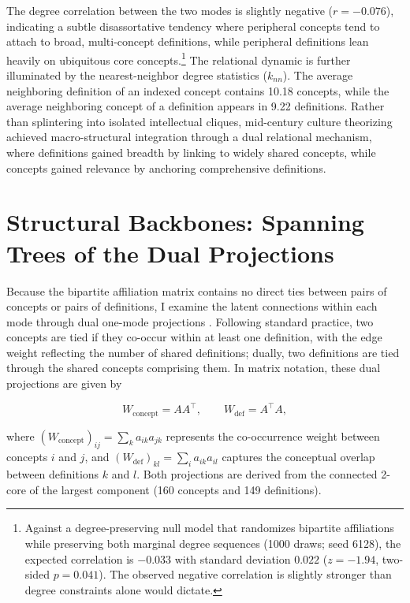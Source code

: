 \documentclass[11pt]{article}
\begin{document}
The degree correlation between the two modes is slightly negative ($r = -0.076$), indicating a subtle disassortative tendency where peripheral concepts tend to attach to broad, multi-concept definitions, while peripheral definitions lean heavily on ubiquitous core concepts.\footnote{Against a degree-preserving null model that randomizes bipartite affiliations while preserving both marginal degree sequences (1000 draws; seed 6128), the expected correlation is $-0.033$ with standard deviation $0.022$ ($z = -1.94$, two-sided $p = 0.041$). The observed negative correlation is slightly stronger than degree constraints alone would dictate.} The relational dynamic is further illuminated by the nearest-neighbor degree statistics ($k_{nn}$). The average neighboring definition of an indexed concept contains 10.18 concepts, while the average neighboring concept of a definition appears in 9.22 definitions. Rather than splintering into isolated intellectual cliques, mid-century culture theorizing achieved macro-structural integration through a dual relational mechanism, where definitions gained breadth by linking to widely shared concepts, while concepts gained relevance by anchoring comprehensive definitions.

\section{Structural Backbones: Spanning Trees of the Dual Projections}

Because the bipartite affiliation matrix contains no direct ties between pairs of concepts or pairs of definitions, I examine the latent connections within each mode through dual one-mode projections \citep{breiger1974,everett2013dual-projection-c89}. Following standard practice, two concepts are tied if they co-occur within at least one definition, with the edge weight reflecting the number of shared definitions; dually, two definitions are tied through the shared concepts comprising them. In matrix notation, these dual projections are given by

\begin{equation}
W_{\mathrm{concept}} = A A^{\top}, \qquad W_{\mathrm{def}} = A^{\top} A,
\label{eq:projections}
\end{equation}

\noindent where $(W_{\mathrm{concept}})_{ij} = \sum_k a_{ik} a_{jk}$ represents the co-occurrence weight between concepts $i$ and $j$, and $(W_{\mathrm{def}})_{kl} = \sum_i a_{ik} a_{il}$ captures the conceptual overlap between definitions $k$ and $l$. Both projections are derived from the connected 2-core of the largest component (160 concepts and 149 definitions).
\end{document}
